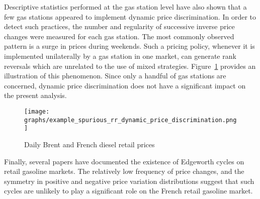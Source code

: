 \documentclass[english]{article}
\begin{document}
Descriptive statistics performed at the gas station level have also shown that a few gas stations appeared to implement dynamic price discrimination. In order to detect such practices, the number and regularity of successive inverse price changes were measured for each gas station. The most commonly observed pattern is a surge in prices during weekends. Such a pricing policy, whenever it is implemented unilaterally by a gas station in one market, can generate rank reversals which are unrelated to the use of mixed strategies. Figure~\ref{fig:rr_dynamic_price_discrimination} provides an illustration of this phenomenon. Since only a handful of gas stations are concerned, dynamic price discrimination does not have a significant impact on the present analysis.

\begin{figure}[H]
    \caption{Daily Brent and French diesel retail prices}
	\centering
		\texttt{[image: graphs/example\_spurious\_rr\_dynamic\_price\_discrimination.png]}
\label{fig:rr_dynamic_price_discrimination}
\end{figure}

Finally, several papers have documented the existence of Edgeworth cycles on retail gasoline markets. The relatively low frequency of price changes, and the symmetry in positive and negative price variation distributions suggest that such cycles are unlikely to play a significant role on the French retail gasoline market.
\end{document}
